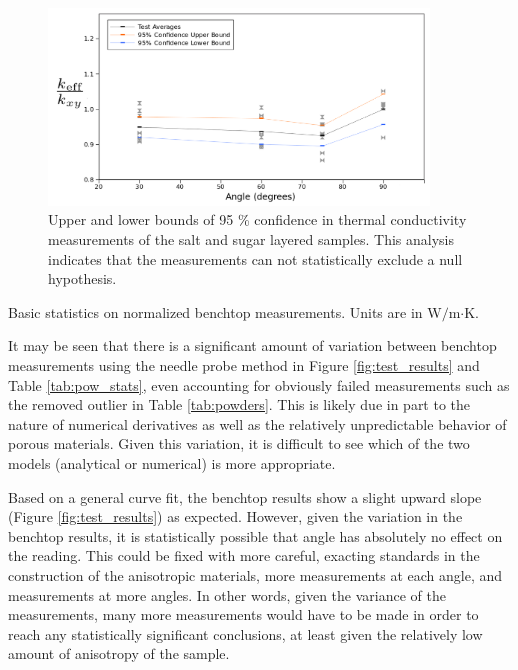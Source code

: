 \begin{figure}[h]
\centering
\includegraphics[width=0.9\textwidth]{fig/test_results_confidence.png}
\caption{Upper and lower bounds of 95 \% confidence in thermal conductivity measurements of the salt and sugar layered samples. This analysis 
indicates that the measurements can not statistically exclude a null hypothesis.}
\label{fig:test_confidence}
\end{figure}

\begin{table}[h]
\centering

\caption{Basic statistics on normalized benchtop measurements.  Units are in W\(/\)m\(\cdot\)K.}
\label{tab:pow_stats}
\end{table}


It may be seen that there is a significant amount of variation between
benchtop measurements using the needle probe method in Figure \ref{fig:test_results} and Table \ref{tab:pow_stats}, even accounting for obviously failed measurements such as the removed outlier in Table \ref{tab:powders}.
This is likely due in part to the nature of numerical derivatives as well as the relatively
unpredictable behavior of porous materials. Given
this variation, it is difficult to see which of the two models (analytical or numerical) is more appropriate.

Based on a general curve fit, the benchtop results show a slight upward slope (Figure \ref{fig:test_results}) as
expected. However, given the variation in the benchtop results, it is statistically
possible that angle has absolutely no effect on the reading. This could be fixed
with more careful, exacting standards in the construction of the anisotropic
materials, more measurements at each angle, and measurements at more angles.
In other words, given the variance of the measurements, many more measurements
would have to be made in order to reach any statistically significant
conclusions, at least given the relatively low amount of anisotropy of the sample.

